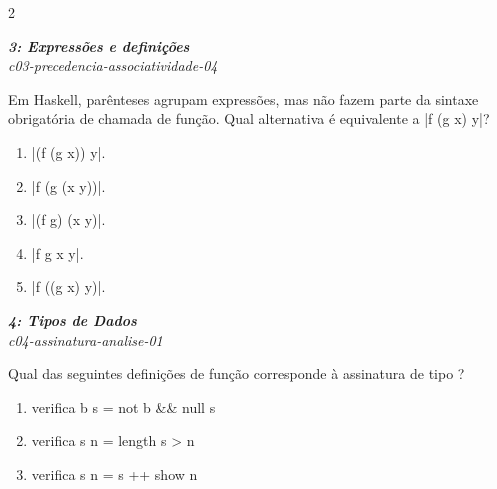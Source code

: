 \documentclass[a4paper,10pt,brazil]{article}
\begin{document}
\begin{multicols}{2}
\begin{flushright}
  \footnotesize
  \textit{\textbf{3: Expressões e definições}}\\
  \textit{c03-precedencia-associatividade-04}\\

\end{flushright}
Em Haskell, parênteses agrupam expressões, mas não fazem parte da sintaxe obrigatória de chamada de função. Qual alternativa é equivalente a \haskellinline|f (g x) y|?

\begin{enumerate}
  \item \haskellinline|(f (g x)) y|.

  \item \haskellinline|f (g (x y))|.

  \item \haskellinline|(f g) (x y)|.

  \item \haskellinline|f g x y|.

  \item \haskellinline|f ((g x) y)|.


\end{enumerate}

\begin{flushright}
  \footnotesize
  \textit{\textbf{4: Tipos de Dados}}\\
  \textit{c04-assinatura-analise-01}\\

\end{flushright}
Qual das seguintes definições de função corresponde à assinatura de tipo ?

\begin{enumerate}
  \item \begin{haskellcode}
verifica b s = not b && null s
\end{haskellcode}

  \item \begin{haskellcode}
verifica s n = length s > n
\end{haskellcode}

  \item \begin{haskellcode}
verifica s n = s ++ show n
\end{haskellcode}


\end{enumerate}
\end{multicols}
\end{document}
